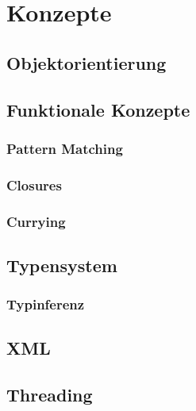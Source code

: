 \section{Konzepte}

\subsection{Objektorientierung}

\subsection{Funktionale Konzepte}

\subsubsection{Pattern Matching}

\subsubsection{Closures}

\subsubsection{Currying}

\subsection{Typensystem}

\subsubsection{Typinferenz}

\subsection{XML}

\subsection{Threading}
